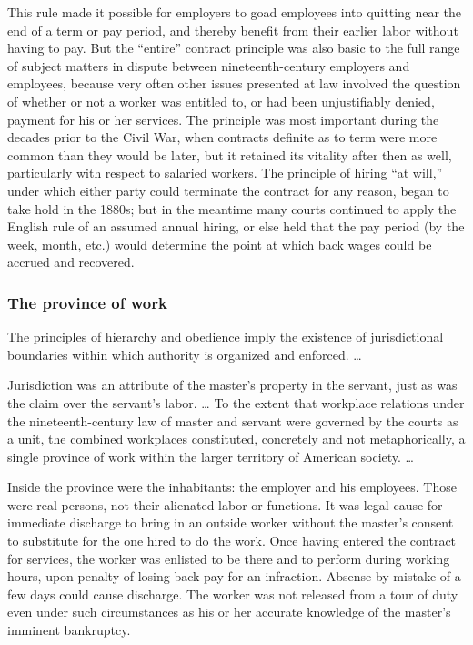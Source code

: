 \documentclass[
  letterpaper,
  11pt,
  DIV=9,
  openright]{scrbook}
\begin{document}
This rule made it possible for employers to goad employees into quitting
near the end of a term or pay period, and thereby benefit from their
earlier labor without having to pay. But the ``entire'' contract
principle was also basic to the full range of subject matters in dispute
between nineteenth-century employers and employees, because very often
other issues presented at law involved the question of whether or not a
worker was entitled to, or had been unjustifiably denied, payment for
his or her services. The principle was most important during the decades
prior to the Civil War, when contracts definite as to term were more
common than they would be later, but it retained its vitality after then
as well, particularly with respect to salaried workers. The principle of
hiring ``at will,'' under which either party could terminate the
contract for any reason, began to take hold in the 1880s; but in the
meantime many courts continued to apply the English rule of an assumed
annual hiring, or else held that the pay period (by the week, month,
etc.) would determine the point at which back wages could be accrued and
recovered.

\subsubsection{The province of work}\label{the-province-of-work}

The principles of hierarchy and obedience imply the existence of
jurisdictional boundaries within which authority is organized and
enforced. \ldots{}

Jurisdiction was an attribute of the master's property in the servant,
just as was the claim over the servant's labor. \ldots{} To the extent
that workplace relations under the nineteenth-century law of master and
servant were governed by the courts as a unit, the combined workplaces
constituted, concretely and not metaphorically, a single province of
work within the larger territory of American society. \ldots{}

Inside the province were the inhabitants: the employer and his
employees. Those were real persons, not their alienated labor or
functions. It was legal cause for immediate discharge to bring in an
outside worker without the master's consent to substitute for the one
hired to do the work. Once having entered the contract for services, the
worker was enlisted to be there and to perform during working hours,
upon penalty of losing back pay for an infraction. Absense by mistake of
a few days could cause discharge. The worker was not released from a
tour of duty even under such circumstances as his or her accurate
knowledge of the master's imminent bankruptcy.
\end{document}
